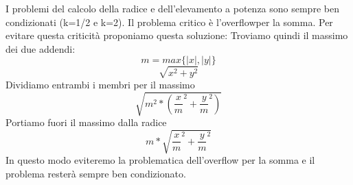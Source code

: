 I problemi del calcolo della radice e dell'elevamento a potenza sono sempre ben condizionati (k=1/2 e k=2).  Il problema critico è l'overflowper la somma. Per evitare questa criticità proponiamo questa soluzione:
Troviamo quindi il massimo dei due addendi:\\
\[
m = max\{|x|,|y|\}
\]
\[
\sqrt{x^2 + y^2}
\]
Dividiamo entrambi i membri per il massimo
\[
\sqrt{m^2*(\frac{x}{m}^2 + \frac{y}{m}^2)}
\]
Portiamo fuori il massimo dalla radice
\[
m*\sqrt{\frac{x}{m}^2 + \frac{y}{m}^2}
\]
In questo modo eviteremo la problematica dell'overflow per la somma e il problema resterà sempre ben condizionato.
